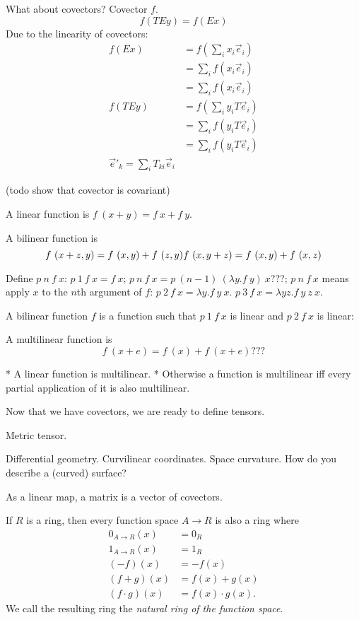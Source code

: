 What about covectors?
Covector $f$.
\[
f(TEy) = f(Ex)
\]
Due to the linearity of covectors:
\begin{align*}
f(Ex) &= f\left(\sum_i x_i \vec{e}_i\right)
\\ &= \sum_i f(x_i \vec{e}_i)
\\ &= \sum_i f(x_i \vec{e}_i)
\\ f(TEy) &= f\left(\sum_i y_i T\vec{e}_i \right)
\\ &= \sum_i f(y_i T\vec{e}_i)
\\ &= \sum_i f(y_i T\vec{e}_i)
\\ \vec{e}'_k = \sum_i T_{ki} \vec{e}_i
\end{align*}

(todo show that covector is covariant)

A linear function is $f~(x+y) = f~x + f~y$.

A bilinear function is
\[
f~(x+z,y) = f~(x,y) + f~(z,y)
\\ f~(x,y+z) = f~(x,y) + f~(x,z)
\]

Define $p~n~f~x$:
$p~1~f~x = f~x$;
$p~n~f~x = p~(n-1)~(\lambda y. f~y)~x$???;
$p~n~f~x$ means apply $x$ to the $n$th argument of $f$:
$p~2~f~x = \lambda y. f~y~x$.
$p~3~f~x = \lambda y z. f~y~z~x$.

A bilinear function $f$ is a function such that $p~1~f~x$ is linear
and $p~2~f~x$ is linear:

A multilinear function is
\[
f~(x + e) = f~(x) + f~(x + e)???
\]

* A linear function is multilinear.
* Otherwise a function is multilinear iff every partial application of it is also multilinear.

Now that we have covectors, we are ready to define tensors.

Metric tensor.

Differential geometry. Curvilinear coordinates. Space curvature.
How do you describe a (curved) surface?

As a linear map, a matrix is a vector of covectors.

If $R$ is a ring, then every function space $A \to R$ is also a ring where
\begin{align*}
    0_{A\to R}(x) &= 0_R
    \\ 1_{A\to R}(x) &= 1_R
    \\ (- f)(x) &= - f(x)
    \\ (f + g)(x) &= f(x) + g(x)
    \\ (f \cdot g)(x) &= f(x) \cdot g(x).
\end{align*}
We call the resulting ring the \emph{natural ring of the function space}.

